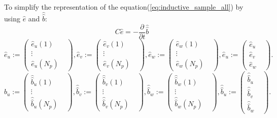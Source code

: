 To simplify the representation of the equation(\ref{eq:inductive_sample_all}) by using $\widehat{e}$ and $\widehat{\widehat{b}}$:
\begin{equation}
C\widehat{e}=-\frac{\partial}{\partial{t}}\widehat{\widehat{b}}
\label{eq:inductive_integral_all}
\end{equation}
\begin{equation}
\widehat{e}_{u}:=
\begin{pmatrix}
\widehat{e}_{u}(1)&\\
\vdots&\\
\widehat{e}_{u}(N_{p})&
\end{pmatrix},
\widehat{e}_{v}:=
\begin{pmatrix}
\widehat{e}_{v}(1)&\\
\vdots&\\
\widehat{e}_{v}(N_{p})&
\end{pmatrix},
\widehat{e}_{w}:=
\begin{pmatrix}
\widehat{e}_{w}(1)&\\
\vdots&\\
\widehat{e}_{w}(N_{p})&
\end{pmatrix},
\widehat{e}_{u}:=
\begin{pmatrix}
\widehat{e}_{u}&\\
\widehat{e}_{v}&\\
\widehat{e}_{w}&
\end{pmatrix}.
\label{eq:vector_e_voltage}
\end{equation}
\begin{equation}
\widehat{\widehat{b}}_{u}:=
\begin{pmatrix}
\widehat{\widehat{b}}_{u}(1)&\\
\vdots&\\
\widehat{\widehat{b}}_{u}(N_{p})&
\end{pmatrix},
\widehat{\widehat{b}}_{v}:=
\begin{pmatrix}
\widehat{\widehat{b}}_{v}(1)&\\
\vdots&\\
\widehat{\widehat{b}}_{v}(N_{p})&
\end{pmatrix},
\widehat{\widehat{b}}_{w}:=
\begin{pmatrix}
\widehat{\widehat{b}}_{w}(1)&\\
\vdots&\\
\widehat{\widehat{b}}_{w}(N_{p})&
\end{pmatrix},
\widehat{\widehat{b}}_{u}:=
\begin{pmatrix}
\widehat{\widehat{b}}_{u}&\\
\widehat{\widehat{b}}_{v}&\\
\widehat{\widehat{b}}_{w}&
\end{pmatrix}.
\label{eq:vector_m_flux}
\end{equation}
